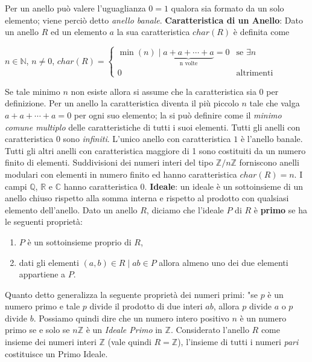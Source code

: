\documentclass[a4paper,12pt]{tesiinfo}
\begin{document}
Per un anello pu\`o valere l'uguaglianza $0 = 1$ qualora sia formato da un solo elemento; viene perci\`o detto \textit{anello banale}.
\newline\newline
%
%
%
\textbf{Caratteristica di un Anello}: Dato un anello $R$ ed un elemento $a$ la sua caratteristica $char(R)$ \`e definita come \begin{center} $n  \in \mathbb{N}$, $n \ne 0 $, $char(R) = \begin{cases} \min (n) \mid \underbrace{a+a+\cdots+a}_\text{n volte} = 0 & \mbox{se }\exists n\\
0 & \mbox{altrimenti}
\end{cases}$
\end{center}
Se tale minimo $n$ non esiste allora si assume che la caratteristica sia 0 per definizione.
Per un anello la caratteristica diventa il pi\`u piccolo $n$ tale che valga $a+a+\cdots+a{{=}}0$ per ogni suo elemento; la si pu\`o definire come il \textit{minimo comune multiplo} delle caratteristiche di tutti i suoi elementi. 
Tutti gli anelli con caratteristica $0$ sono \textit{infiniti}.
\newline
L'unico anello con caratteristica $1$ \`e l'anello banale.
\newline
Tutti gli altri anelli con caratteristica maggiore di 1 sono costituiti da un numero finito di elementi. Suddivisioni dei numeri interi del tipo $\mathbb{Z}/n\mathbb{Z}$ forniscono anelli modulari con elementi in numero finito ed hanno caratteristica $char(R) = n$.\newline
I campi $\mathbb{Q}$, $\mathbb{R}$ e $\mathbb{C}$ hanno caratteristica $0$.
\newline\newline
%
%
%
\textbf{Ideale}: un ideale \`e un sottoinsieme di un anello chiuso rispetto alla somma interna e rispetto al prodotto con qualsiasi elemento dell'anello.
Dato un anello $R$, diciamo che l'ideale $P$ di $R$ \`e \textbf{primo} se ha le seguenti propriet\`a:
\begin{enumerate}
    \item $P$ \`e un sottoinsieme proprio di $R$,
    \item dati gli elementi $(a, b) \in R \mid ab \in P$ allora almeno uno dei due elementi appartiene a $P$.
\end{enumerate}
Quanto detto generalizza la seguente propriet\`a dei numeri primi: "se $p$ \`e un numero primo e tale $p$ divide il prodotto di due interi $ab$, allora $p$ divide $a$ o $p$ divide $b$. Possiamo quindi dire che un numero intero positivo $n$ \`e un numero primo se e solo se $n\mathbb{Z}$ \`e un \textit{Ideale Primo} in $\mathbb{Z}$. Considerato l'anello $R$ come insieme dei numeri interi $\mathbb{Z}$ (vale quindi $R = \mathbb{Z}$), l'insieme di tutti i numeri \textit{pari} costituisce un Primo Ideale.
\end{document}
